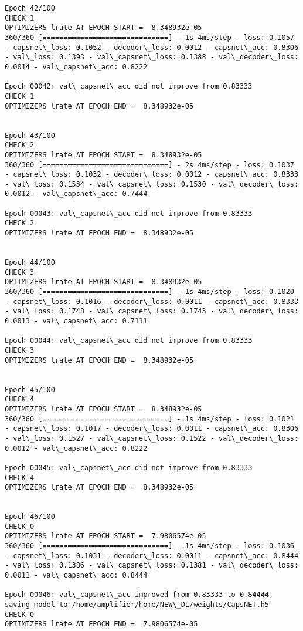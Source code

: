 \documentclass[11pt]{article}
\begin{document}
\begin{Verbatim}[commandchars=\\\{\}]
Epoch 42/100
CHECK 1
OPTIMIZERS lrate AT EPOCH START =  8.348932e-05
360/360 [==============================] - 1s 4ms/step - loss: 0.1057 - capsnet\_loss: 0.1052 - decoder\_loss: 0.0012 - capsnet\_acc: 0.8306 - val\_loss: 0.1393 - val\_capsnet\_loss: 0.1388 - val\_decoder\_loss: 0.0014 - val\_capsnet\_acc: 0.8222

Epoch 00042: val\_capsnet\_acc did not improve from 0.83333
CHECK 1
OPTIMIZERS lrate AT EPOCH END =  8.348932e-05 


Epoch 43/100
CHECK 2
OPTIMIZERS lrate AT EPOCH START =  8.348932e-05
360/360 [==============================] - 2s 4ms/step - loss: 0.1037 - capsnet\_loss: 0.1032 - decoder\_loss: 0.0012 - capsnet\_acc: 0.8333 - val\_loss: 0.1534 - val\_capsnet\_loss: 0.1530 - val\_decoder\_loss: 0.0012 - val\_capsnet\_acc: 0.7444

Epoch 00043: val\_capsnet\_acc did not improve from 0.83333
CHECK 2
OPTIMIZERS lrate AT EPOCH END =  8.348932e-05 


Epoch 44/100
CHECK 3
OPTIMIZERS lrate AT EPOCH START =  8.348932e-05
360/360 [==============================] - 1s 4ms/step - loss: 0.1020 - capsnet\_loss: 0.1016 - decoder\_loss: 0.0011 - capsnet\_acc: 0.8333 - val\_loss: 0.1748 - val\_capsnet\_loss: 0.1743 - val\_decoder\_loss: 0.0013 - val\_capsnet\_acc: 0.7111

Epoch 00044: val\_capsnet\_acc did not improve from 0.83333
CHECK 3
OPTIMIZERS lrate AT EPOCH END =  8.348932e-05 


Epoch 45/100
CHECK 4
OPTIMIZERS lrate AT EPOCH START =  8.348932e-05
360/360 [==============================] - 1s 4ms/step - loss: 0.1021 - capsnet\_loss: 0.1017 - decoder\_loss: 0.0011 - capsnet\_acc: 0.8306 - val\_loss: 0.1527 - val\_capsnet\_loss: 0.1522 - val\_decoder\_loss: 0.0012 - val\_capsnet\_acc: 0.8222

Epoch 00045: val\_capsnet\_acc did not improve from 0.83333
CHECK 4
OPTIMIZERS lrate AT EPOCH END =  8.348932e-05 


Epoch 46/100
CHECK 0
OPTIMIZERS lrate AT EPOCH START =  7.9806574e-05
360/360 [==============================] - 1s 4ms/step - loss: 0.1036 - capsnet\_loss: 0.1031 - decoder\_loss: 0.0011 - capsnet\_acc: 0.8444 - val\_loss: 0.1386 - val\_capsnet\_loss: 0.1381 - val\_decoder\_loss: 0.0011 - val\_capsnet\_acc: 0.8444

Epoch 00046: val\_capsnet\_acc improved from 0.83333 to 0.84444, saving model to /home/amplifier/home/NEW\_DL/weights/CapsNET.h5
CHECK 0
OPTIMIZERS lrate AT EPOCH END =  7.9806574e-05 



\end{Verbatim}
\end{document}
